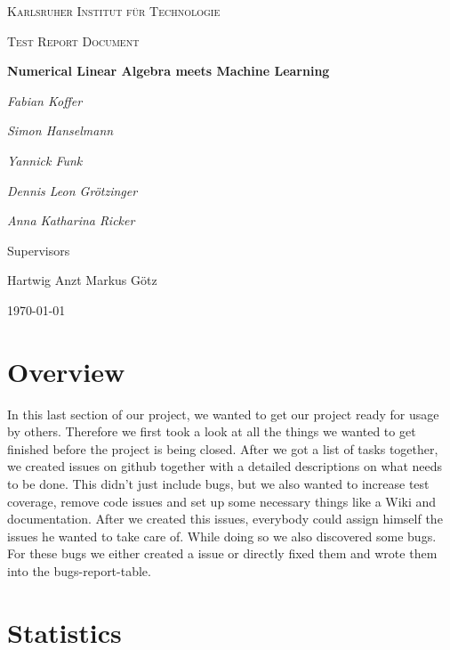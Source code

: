 \documentclass[parskip=full]{scrartcl}
\begin{document}
\begin{titlepage}
\centering
{\scshape\LARGE Karlsruher Institut für Technologie\par}
\vspace{1cm}
{\scshape\Large Test Report Document \par}
\vspace{1.5cm}
{\huge\bfseries Numerical Linear Algebra meets Machine Learning \par}
\vspace {2cm}

{\Large\itshape Fabian Koffer\par}
{\Large\itshape Simon Hanselmann\par}
{\Large\itshape Yannick Funk\par}
{\Large\itshape Dennis Leon Gr\"{o}tzinger\par}
{\Large\itshape Anna Katharina Ricker\par}

\vfill
Supervisors\par
Hartwig Anzt
Markus G\"{o}tz


\vfill
{\large\today\par}
\end{titlepage}

\tableofcontents
\newpage

\section{Overview}

In this last section of our project, we wanted to get our project ready for usage by others. 
Therefore we first took a look at all the things we wanted to get finished before the project is being closed.
After we got a list of tasks together, we created issues on \gls{github} together with a detailed descriptions on what needs to be done.
This didn't just include bugs, but we also wanted to increase test coverage, remove code issues and set up some necessary things like a Wiki and documentation.
After we created this issues, everybody could assign himself the issues he wanted to take care of.
While doing so we also discovered some bugs.
For these bugs we either created a issue or directly fixed them and wrote them into the bugs-report-table.

\newpage

\section{Statistics}
\end{document}
